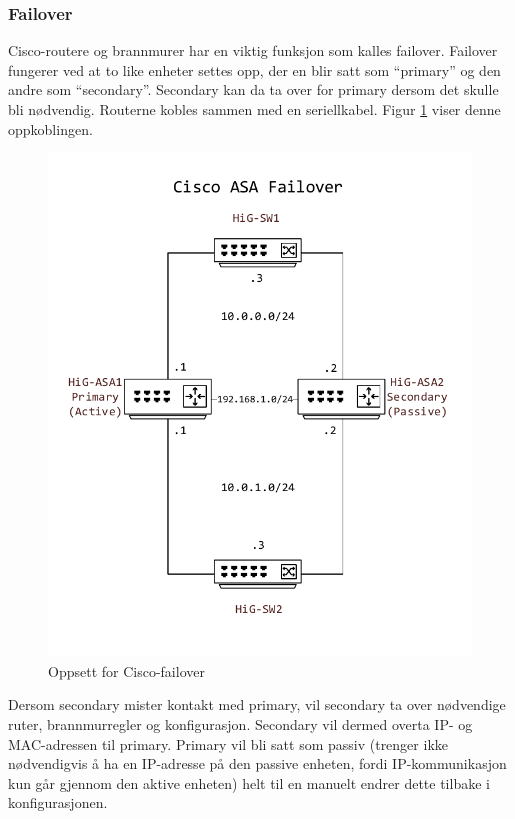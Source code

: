 \subsubsection{Failover}
Cisco-routere og brannmurer har en viktig funksjon som kalles failover. Failover fungerer ved at to like enheter settes opp, der en blir satt som ``primary'' og den andre som ``secondary''. Secondary kan da ta over for primary dersom det skulle bli nødvendig. Routerne kobles sammen med en seriellkabel. Figur \ref{ciscoasafailover} viser denne oppkoblingen. 

\begin{figure}[H]
    \centering
    \includegraphics[scale=0.6]{img/asafailover}
    \caption{Oppsett for Cisco-failover}
    \label{ciscoasafailover}
\end{figure}

Dersom secondary mister kontakt med primary, vil secondary ta over nødvendige ruter, brannmurregler og konfigurasjon. Secondary vil dermed overta IP- og MAC-adressen til primary. Primary vil bli satt som passiv (trenger ikke nødvendigvis å ha en IP-adresse på den passive enheten, fordi IP-kommunikasjon kun går gjennom den aktive enheten) helt til en manuelt endrer dette tilbake i konfigurasjonen. \cite{ciscofailover} 

